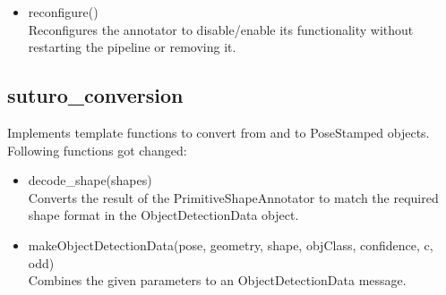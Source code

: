 \documentclass[main.tex]{subfiles}
\begin{document}
\begin{itemize}
\item reconfigure()\\
Reconfigures the annotator to disable/enable its functionality without restarting the pipeline or removing it.
\end{itemize}

\subsection{suturo\_conversion}
Implements template functions to convert from and to PoseStamped objects.
Following functions got changed:

\begin{itemize}
\item decode\_shape(shapes)\\
Converts the result of the PrimitiveShapeAnnotator to match the required shape format in the ObjectDetectionData object.

\item makeObjectDetectionData(pose, geometry, shape, objClass, confidence, c, odd)\\
Combines the given parameters to an ObjectDetectionData message.
\end{itemize}

\endgroup
\end{document}
